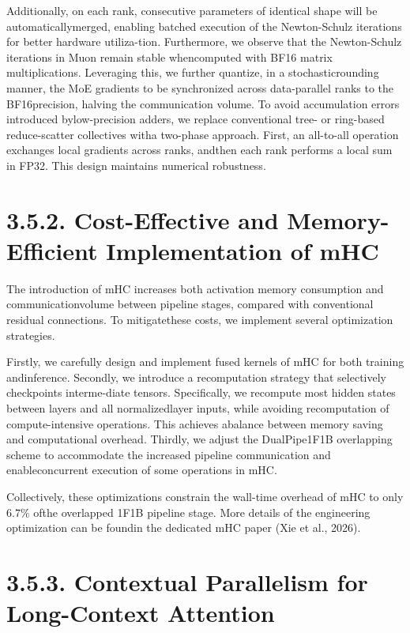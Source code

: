 \documentclass[
  10
]{article}
\begin{document}
Additionally, on each rank, consecutive parameters of identical shape
will be automaticallymerged, enabling batched execution of the
Newton-Schulz iterations for better hardware utiliza-tion. Furthermore,
we observe that the Newton-Schulz iterations in Muon remain stable
whencomputed with BF16 matrix multiplications. Leveraging this, we
further quantize, in a stochasticrounding manner, the MoE gradients to
be synchronized across data-parallel ranks to the BF16precision, halving
the communication volume. To avoid accumulation errors introduced
bylow-precision adders, we replace conventional tree- or ring-based
reduce-scatter collectives witha two-phase approach. First, an
all-to-all operation exchanges local gradients across ranks, andthen
each rank performs a local sum in FP32. This design maintains numerical
robustness.

\section{3.5.2. Cost-Effective and Memory-Efficient Implementation of
mHC}\label{cost-effective-and-memory-efficient-implementation-of-mhc}

The introduction of mHC increases both activation memory consumption and
communicationvolume between pipeline stages, compared with conventional
residual connections. To mitigatethese costs, we implement several
optimization strategies.

Firstly, we carefully design and implement fused kernels of mHC for both
training andinference. Secondly, we introduce a recomputation strategy
that selectively checkpoints interme-diate tensors. Specifically, we
recompute most hidden states between layers and all normalizedlayer
inputs, while avoiding recomputation of compute-intensive operations.
This achieves abalance between memory saving and computational overhead.
Thirdly, we adjust the DualPipe1F1B overlapping scheme to accommodate
the increased pipeline communication and enableconcurrent execution of
some operations in mHC.

Collectively, these optimizations constrain the wall-time overhead of
mHC to only \(6 . 7 \%\) ofthe overlapped 1F1B pipeline stage. More
details of the engineering optimization can be foundin the dedicated mHC
paper (Xie et al., 2026).

\section{3.5.3. Contextual Parallelism for Long-Context
Attention}\label{contextual-parallelism-for-long-context-attention}
\end{document}
